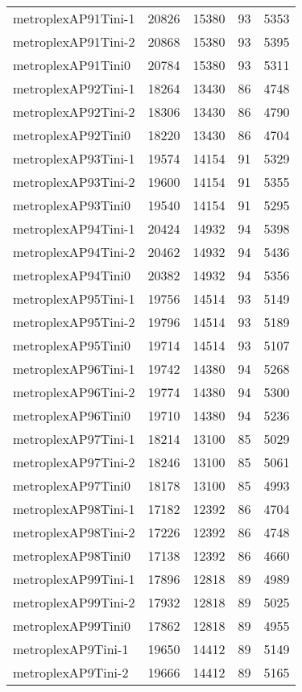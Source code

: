 \begin{tabular}{lrrrr}
metroplexAP91Tini-1 & 20826 & 15380 & 93 & 5353 \\
metroplexAP91Tini-2 & 20868 & 15380 & 93 & 5395 \\
metroplexAP91Tini0 & 20784 & 15380 & 93 & 5311 \\
metroplexAP92Tini-1 & 18264 & 13430 & 86 & 4748 \\
metroplexAP92Tini-2 & 18306 & 13430 & 86 & 4790 \\
metroplexAP92Tini0 & 18220 & 13430 & 86 & 4704 \\
metroplexAP93Tini-1 & 19574 & 14154 & 91 & 5329 \\
metroplexAP93Tini-2 & 19600 & 14154 & 91 & 5355 \\
metroplexAP93Tini0 & 19540 & 14154 & 91 & 5295 \\
metroplexAP94Tini-1 & 20424 & 14932 & 94 & 5398 \\
metroplexAP94Tini-2 & 20462 & 14932 & 94 & 5436 \\
metroplexAP94Tini0 & 20382 & 14932 & 94 & 5356 \\
metroplexAP95Tini-1 & 19756 & 14514 & 93 & 5149 \\
metroplexAP95Tini-2 & 19796 & 14514 & 93 & 5189 \\
metroplexAP95Tini0 & 19714 & 14514 & 93 & 5107 \\
metroplexAP96Tini-1 & 19742 & 14380 & 94 & 5268 \\
metroplexAP96Tini-2 & 19774 & 14380 & 94 & 5300 \\
metroplexAP96Tini0 & 19710 & 14380 & 94 & 5236 \\
metroplexAP97Tini-1 & 18214 & 13100 & 85 & 5029 \\
metroplexAP97Tini-2 & 18246 & 13100 & 85 & 5061 \\
metroplexAP97Tini0 & 18178 & 13100 & 85 & 4993 \\
metroplexAP98Tini-1 & 17182 & 12392 & 86 & 4704 \\
metroplexAP98Tini-2 & 17226 & 12392 & 86 & 4748 \\
metroplexAP98Tini0 & 17138 & 12392 & 86 & 4660 \\
metroplexAP99Tini-1 & 17896 & 12818 & 89 & 4989 \\
metroplexAP99Tini-2 & 17932 & 12818 & 89 & 5025 \\
metroplexAP99Tini0 & 17862 & 12818 & 89 & 4955 \\
metroplexAP9Tini-1 & 19650 & 14412 & 89 & 5149 \\
metroplexAP9Tini-2 & 19666 & 14412 & 89 & 5165 \\

\end{tabular}
